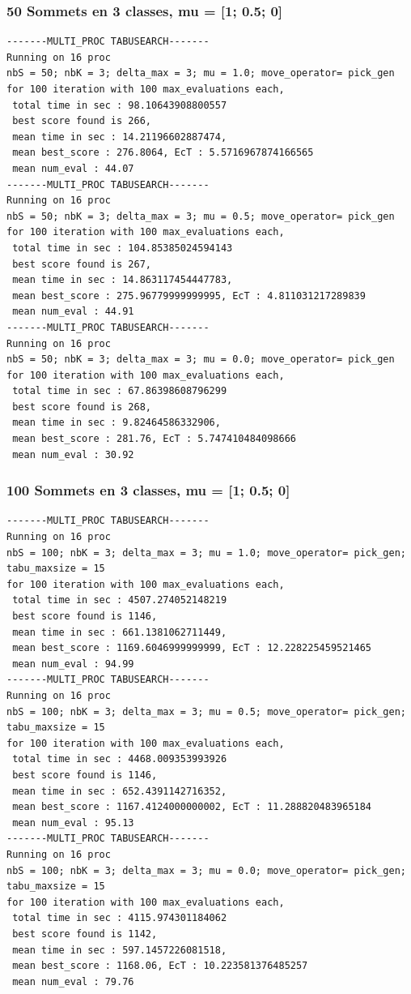\documentclass[a4paper]{article}
\begin{document}
\subsubsection{50 Sommets en 3 classes, mu = [1; 0.5; 0]}
\begin{verbatim}
-------MULTI_PROC TABUSEARCH-------
Running on 16 proc
nbS = 50; nbK = 3; delta_max = 3; mu = 1.0; move_operator= pick_gen
for 100 iteration with 100 max_evaluations each, 
 total time in sec : 98.10643908800557
 best score found is 266,
 mean time in sec : 14.21196602887474,
 mean best_score : 276.8064, EcT : 5.5716967874166565
 mean num_eval : 44.07
-------MULTI_PROC TABUSEARCH-------
Running on 16 proc
nbS = 50; nbK = 3; delta_max = 3; mu = 0.5; move_operator= pick_gen
for 100 iteration with 100 max_evaluations each, 
 total time in sec : 104.85385024594143
 best score found is 267,
 mean time in sec : 14.863117454447783,
 mean best_score : 275.96779999999995, EcT : 4.811031217289839
 mean num_eval : 44.91
-------MULTI_PROC TABUSEARCH-------
Running on 16 proc
nbS = 50; nbK = 3; delta_max = 3; mu = 0.0; move_operator= pick_gen
for 100 iteration with 100 max_evaluations each, 
 total time in sec : 67.86398608796299
 best score found is 268,
 mean time in sec : 9.82464586332906,
 mean best_score : 281.76, EcT : 5.747410484098666
 mean num_eval : 30.92
\end{verbatim}
\subsubsection{100 Sommets en 3 classes, mu = [1; 0.5; 0]}
\begin{verbatim}
-------MULTI_PROC TABUSEARCH-------
Running on 16 proc
nbS = 100; nbK = 3; delta_max = 3; mu = 1.0; move_operator= pick_gen; tabu_maxsize = 15
for 100 iteration with 100 max_evaluations each,
 total time in sec : 4507.274052148219
 best score found is 1146,
 mean time in sec : 661.1381062711449,
 mean best_score : 1169.6046999999999, EcT : 12.228225459521465
 mean num_eval : 94.99
-------MULTI_PROC TABUSEARCH-------
Running on 16 proc
nbS = 100; nbK = 3; delta_max = 3; mu = 0.5; move_operator= pick_gen; tabu_maxsize = 15
for 100 iteration with 100 max_evaluations each,
 total time in sec : 4468.009353993926
 best score found is 1146,
 mean time in sec : 652.4391142716352,
 mean best_score : 1167.4124000000002, EcT : 11.288820483965184
 mean num_eval : 95.13
-------MULTI_PROC TABUSEARCH-------
Running on 16 proc
nbS = 100; nbK = 3; delta_max = 3; mu = 0.0; move_operator= pick_gen; tabu_maxsize = 15
for 100 iteration with 100 max_evaluations each,
 total time in sec : 4115.974301184062
 best score found is 1142,
 mean time in sec : 597.1457226081518,
 mean best_score : 1168.06, EcT : 10.223581376485257
 mean num_eval : 79.76
\end{verbatim}
\end{document}

